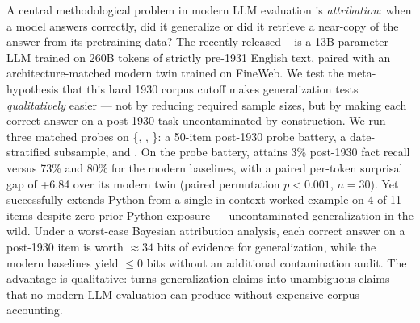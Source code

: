 A central methodological problem in modern LLM evaluation is \emph{attribution}: when a model answers correctly, did it generalize or did it retrieve a near-copy of the answer from its pretraining data? The recently released \talkienineteen~\citep{talkielm2026} is a 13B-parameter LLM trained on 260B tokens of strictly pre-1931 English text, paired with an architecture-matched modern twin \talkieweb trained on FineWeb. We test the meta-hypothesis that this hard 1930 corpus cutoff makes generalization tests \emph{qualitatively} easier --- not by reducing required sample sizes, but by making each correct answer on a post-1930 task uncontaminated by construction. We run three matched probes on \{\talkienineteen, \talkieweb, \gptfour\}: a 50-item post-1930 probe battery, a date-stratified \mmlu subsample, and \humaneval. On the probe battery, \talkienineteen attains 3\% post-1930 fact recall versus 73\% and 80\% for the modern baselines, with a paired per-token surprisal gap of +6.84 \bpt over its modern twin (paired permutation $p < 0.001$, $n=30$). Yet \talkienineteen successfully extends Python from a single in-context worked example on 4 of 11 items despite zero prior Python exposure --- uncontaminated generalization in the wild. Under a worst-case Bayesian attribution analysis, each correct \talkienineteen answer on a post-1930 item is worth $\approx 34$ bits of evidence for generalization, while the modern baselines yield $\le 0$ bits without an additional contamination audit. The advantage is qualitative: \talkienineteen turns generalization claims into unambiguous claims that no modern-LLM evaluation can produce without expensive corpus accounting.
